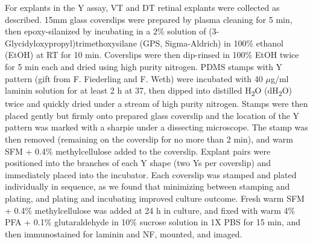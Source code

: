 For explants in the Y assay, VT and DT retinal explants were collected as described.
15mm glass coverslips were prepared by plasma cleaning for 5 min, then epoxy-silanized by incubating in a 2\% solution of (3-Glycidyloxypropyl)trimethoxysilane (GPS, Sigma-Aldrich) in 100\% ethanol (EtOH) at RT for 10 min.
Coverslips were then dip-rinsed in 100\% EtOH twice for 5 min each and dried using high purity nitrogen.
PDMS stamps with Y pattern (gift from F. Fiederling and F. Weth) were incubated with 40 $\mu$g/ml laminin solution for at least 2 h at 37\textcelsius, then dipped into distilled H\textsubscript{2}O (dH\textsubscript{2}O) twice and quickly dried under a stream of high purity nitrogen.
Stamps were then placed gently but firmly onto prepared glass coverslip and the location of the Y pattern was marked with a sharpie under a dissecting microscope.
The stamp was then removed (remaining on the coverslip for no more than 2 min), and warm SFM + 0.4\% methylcellulose added to the coverslip.
Explant pairs were positioned into the branches of each Y shape (two Ys per coverslip) and immediately placed into the incubator.
Each coverslip was stamped and plated individually in sequence, as we found that minimizing between stamping and plating, and plating and incubating improved culture outcome.
Fresh warm SFM + 0.4\% methylcellulose was added at 24 h in culture, and fixed with warm 4\% PFA + 0.1\% glutaraldehyde in 10\% sucrose solution in 1X PBS for 15 min, and then immunostained for laminin and NF, mounted, and imaged.